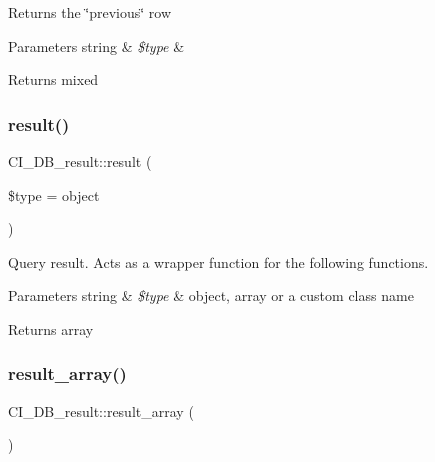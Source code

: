 Returns the \char`\"{}previous\char`\"{} row


\begin{DoxyParams}[1]{Parameters}
string & {\em \$type} & \\
\hline
\end{DoxyParams}
\begin{DoxyReturn}{Returns}
mixed 
\end{DoxyReturn}
\mbox{\label{class_c_i___d_b__result_ab39e89e480cec1f13fc4045a3c46ddb8}} 
\subsubsection{\texorpdfstring{result()}{result()}}
{\footnotesize\ttfamily C\+I\+\_\+\+D\+B\+\_\+result\+::result (\begin{DoxyParamCaption}\item[{}]{\$type = {\ttfamily \textquotesingle{}object\textquotesingle{}} }\end{DoxyParamCaption})}

Query result. Acts as a wrapper function for the following functions.


\begin{DoxyParams}[1]{Parameters}
string & {\em \$type} & \textquotesingle{}object\textquotesingle{}, \textquotesingle{}array\textquotesingle{} or a custom class name \\
\hline
\end{DoxyParams}
\begin{DoxyReturn}{Returns}
array 
\end{DoxyReturn}
\mbox{\label{class_c_i___d_b__result_a84f298e436eca13c753008c23aeff565}} 
\subsubsection{\texorpdfstring{result\+\_\+array()}{result\_array()}}
{\footnotesize\ttfamily C\+I\+\_\+\+D\+B\+\_\+result\+::result\+\_\+array (\begin{DoxyParamCaption}{ }\end{DoxyParamCaption})}

